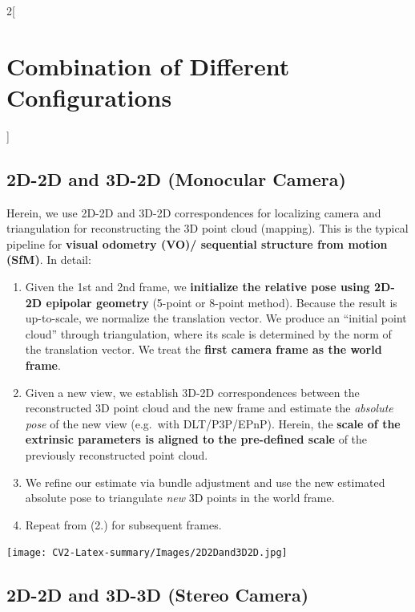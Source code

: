 \documentclass[oneside,fontsize=11pt,paper=a4]{scrartcl}
\begin{document}
\begin{multicols}{2}[\section{Combination of Different Configurations}]

\subsection{2D-2D and 3D-2D (Monocular Camera)}

Herein, we use 2D-2D and 3D-2D correspondences for localizing camera and triangulation for reconstructing the 3D point cloud (mapping). This is the typical pipeline for \textbf{visual odometry (VO)/ sequential structure from motion (SfM)}. In detail:
\begin{enumerate}
    \item Given the 1st and 2nd frame, we \textbf{initialize the relative pose using 2D-2D epipolar geometry} (5-point or 8-point method). Because the result is up-to-scale, we normalize the translation vector. We produce an ``initial point cloud'' through triangulation, where its scale is determined by the norm of the translation vector. We treat the \textbf{first camera frame as the world frame}.
    \item Given a new view, we establish 3D-2D correspondences between the reconstructed 3D point cloud and the new frame and estimate the \textit{absolute pose} of the new view (e.g.\ with DLT/P3P/EPnP). Herein, the \textbf{scale of the extrinsic parameters is aligned to the pre-defined scale} of the previously reconstructed point cloud.
    \item We refine our estimate via bundle adjustment and use the new estimated absolute pose to triangulate \textit{new} 3D points in the world frame.
    \item Repeat from (2.) for subsequent frames.
\end{enumerate}
\begin{center}
    \texttt{[image: CV2-Latex-summary/Images/2D2Dand3D2D.jpg]}
\end{center}

\subsection{2D-2D and 3D-3D (Stereo Camera)}


\end{multicols}
\end{document}
